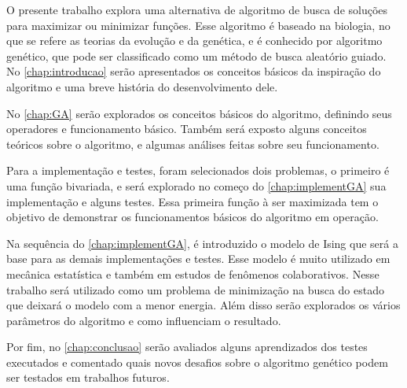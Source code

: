 \documentclass[
	12pt,				%
	openright,			%
	twoside,			%
	a4paper,			%
	english,			%
	brazil				%
	]{abntex2}
\begin{document}
\setlength{\absparsep}{18pt} %
\begin{resumo}

O presente trabalho explora uma alternativa de algoritmo de busca de soluções para maximizar ou minimizar funções. Esse algoritmo é baseado na biologia, no que se refere as teorias da evolução e da genética, e é conhecido por algoritmo genético, que pode ser classificado como um método de busca aleatório guiado. No \autoref{chap:introducao} serão apresentados os conceitos básicos da inspiração do algoritmo e uma breve história do desenvolvimento dele. 

No \autoref{chap:GA} serão explorados os conceitos básicos do algoritmo, definindo seus operadores e funcionamento básico. Também será exposto alguns conceitos teóricos sobre o algoritmo, e algumas análises feitas sobre seu funcionamento.

Para a implementação e testes, foram selecionados dois problemas, o primeiro é uma função bivariada, e será explorado no começo do \autoref{chap:implementGA} sua implementação e alguns testes. Essa primeira função à ser maximizada tem o objetivo de demonstrar os funcionamentos básicos do algoritmo em operação.

Na sequência do \autoref{chap:implementGA}, é introduzido o modelo de Ising que será a base para as demais implementações e testes. Esse modelo é muito utilizado em mecânica estatística e também em estudos de fenômenos colaborativos. Nesse trabalho será utilizado como um problema de minimização na busca do estado que deixará o modelo com a menor energia. Além disso serão explorados os vários parâmetros do algoritmo e como influenciam o resultado.

Por fim, no \autoref{chap:conclusao} serão avaliados alguns aprendizados dos testes executados e comentado quais novos desafios sobre o algoritmo genético podem ser testados em trabalhos futuros.
	
%


\end{resumo}
\end{document}
